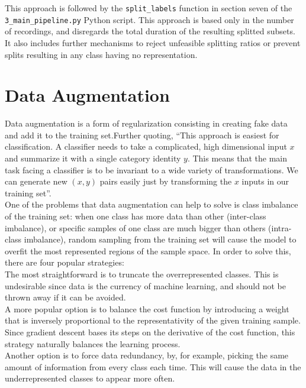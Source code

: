   This approach is followed by the \texttt{split\_labels} function in section seven of the \texttt{3\_main\_pipeline.py} Python script. This approach is based only in the number of recordings, and disregards the total duration of the resulting splitted subsets. It also includes further mechanisms to reject unfeasible splitting ratios or prevent splits resulting in any class having no representation.



  \section{Data Augmentation}\label{data-augm}

  Data augmentation is a form of regularization consisting in creating fake data and add it to the training set\cite[p.240]{goodfellow}.Further quoting, ``This approach is easiest for classification. A classifier needs to take a complicated, high dimensional input \(x\) and summarize it with a single category identity \(y\). This means that the main task facing a classifier is to be invariant to a wide variety of transformations. We can generate new \((x,y)\) pairs easily just by transforming the \(x\) inputs in our training set''.\\

  One of the problems that data augmentation can help to solve is class imbalance of the training set: when one class has more data than other (inter-class imbalance), or specific samples of one class are much bigger than others (intra-class imbalance),  random sampling from the training set will cause the model to overfit the most represented regions of the sample space. In order to solve this, there are four popular strategies:\\

  The most straightforward is to truncate the overrepresented classes. This is undesirable since data is the currency of machine learning, and should not be thrown away if it can be avoided.\\

  A more popular option is to balance the cost function by introducing a weight that is inversely proportional to the representativity of the given training sample. Since gradient descent bases its steps on the derivative of the cost function, this strategy naturally balances the learning process.\\

  Another option is to force data redundancy, by, for example, picking the same amount of information from every class each time. This will cause the data in the underrepresented classes to appear more often.\\

